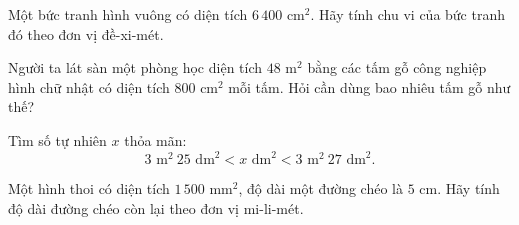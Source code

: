 \begin{ex} %
Một bức tranh hình vuông có diện tích $6\,400\text{ cm}^2$. Hãy tính chu vi của bức tranh đó theo đơn vị đề-xi-mét.
\end{ex}

\begin{ex} %
Người ta lát sàn một phòng học diện tích $48\text{ m}^2$ bằng các tấm gỗ công nghiệp hình chữ nhật có diện tích $800\text{ cm}^2$ mỗi tấm. Hỏi cần dùng bao nhiêu tấm gỗ như thế?
\end{ex}

\begin{ex} %
Tìm số tự nhiên $x$ thỏa mãn:
\[
3\text{ m}^2\ 25\text{ dm}^2 < x\text{ dm}^2 < 3\text{ m}^2\ 27\text{ dm}^2.
\]
\end{ex}

\begin{ex} %
Một hình thoi có diện tích $1\,500\text{ mm}^2$, độ dài một đường chéo là $5\text{ cm}$. Hãy tính độ dài đường chéo còn lại theo đơn vị mi-li-mét.
\end{ex}
